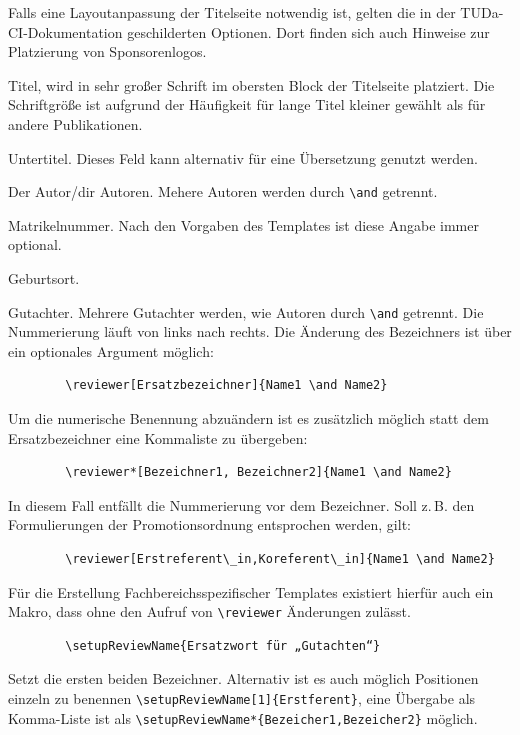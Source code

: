 \documentclass[
	ngerman,%
	accentcolor=9c,%
	ruledheaders=section,%
	class=report,%
	thesis={type=bachelor},%
	fontsize=11pt,%
	parskip=half-,%
	custommargins=true,%
	marginpar=false,%
]{tudapub}
\begin{document}
Falls eine Layoutanpassung der Titelseite notwendig ist, gelten die in der TUDa-CI-Dokumentation \cite{tuda-ci}  geschilderten Optionen. Dort finden sich auch Hinweise zur Platzierung von Sponsorenlogos.

\begin{description}
	\item[title] Titel, wird in sehr großer Schrift im obersten Block der Titelseite platziert. Die Schriftgröße ist aufgrund der Häufigkeit für lange Titel kleiner gewählt als für andere Publikationen.
	\item[subtitle] Untertitel. Dieses Feld kann alternativ für eine Übersetzung genutzt werden.
	\item[author] Der Autor/dir Autoren. Mehere Autoren werden durch \verb+\and+ getrennt.
	\item[studentID] Matrikelnummer. Nach den Vorgaben des Templates ist diese Angabe immer optional.
	\item[birthplace] Geburtsort.
	\item[reviewer] Gutachter. Mehrere Gutachter werden, wie Autoren durch \verb+\and+ getrennt. Die Nummerierung läuft von links nach rechts.
	      Die Änderung des Bezeichners ist über ein optionales Argument möglich:
\begin{verbatim}
        \reviewer[Ersatzbezeichner]{Name1 \and Name2}
\end{verbatim}
	      Um die numerische Benennung abzuändern ist es zusätzlich möglich statt dem Ersatzbezeichner eine Kommaliste zu übergeben:
\begin{verbatim}
        \reviewer*[Bezeichner1, Bezeichner2]{Name1 \and Name2}
\end{verbatim}
	      In diesem Fall entfällt die Nummerierung vor dem Bezeichner. Soll z.\,B. den Formulierungen der Promotionsordnung entsprochen werden, gilt:
\begin{verbatim}
        \reviewer[Erstreferent\_in,Koreferent\_in]{Name1 \and Name2}
\end{verbatim}
	      Für die Erstellung Fachbereichsspezifischer Templates existiert hierfür auch ein Makro, dass ohne den Aufruf von \verb+\reviewer+ Änderungen zulässt.
\begin{verbatim}
        \setupReviewName{Ersatzwort für „Gutachten“}
\end{verbatim}
	      Setzt die ersten beiden Bezeichner. Alternativ ist es auch möglich Positionen einzeln zu benennen \verb+\setupReviewName[1]{Erstferent}+, eine Übergabe als Komma-Liste ist als \verb+\setupReviewName*{Bezeicher1,Bezeicher2}+ möglich.


\end{description}
\end{document}

